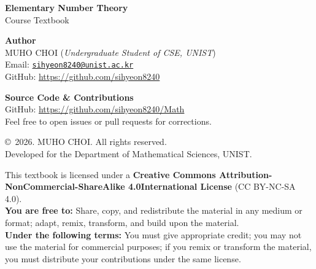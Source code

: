 \documentclass[11pt, a4paper, oneside]{book}
\begin{document}
\begin{flushleft}
    \vfill

    {\large \textbf{Elementary Number Theory}}
    \\[0.2cm]
    {\small Course Textbook} \\
    
    \vspace{2cm}
    
    \textbf{Author} \\
    MUHO CHOI (\emph{Undergraduate Student of CSE, UNIST}) \\
    Email: \href{mailto:sihyeon8240@unist.ac.kr}{\texttt{sihyeon8240@unist.ac.kr}} \\
    GitHub: \url{https://github.com/sihyeon8240} \\
    
    \vspace{1cm}
    
    \textbf{Source Code \& Contributions} \\
    GitHub: \url{https://github.com/sihyeon8240/Math} \\
    \footnotesize{Feel free to open issues or pull requests for corrections.}
    
    \vspace{1cm}
    
    \copyright\ 2026. MUHO CHOI. All rights reserved. \\
    \small{Developed for the Department of Mathematical Sciences, UNIST.} \\

    \vspace{0.4cm}
    
    \footnotesize{
        This textbook is licensed under a
        \textbf{Creative Commons Attribution-NonCommercial-ShareAlike 4.0International License} (CC BY-NC-SA 4.0). \\
        \vspace{0.1cm}
        \textbf{You are free to:} Share, copy, and redistribute the material in any medium or format;
        adapt, remix, transform, and build upon the material. \\
        \textbf{Under the following terms:} You must give appropriate credit;
        you may not use the material for commercial purposes;
        if you remix or transform the material, you must distribute your contributions under the same license.
    }
\end{flushleft}

\tableofcontents

\mainmatter

\backmatter
\end{document}
